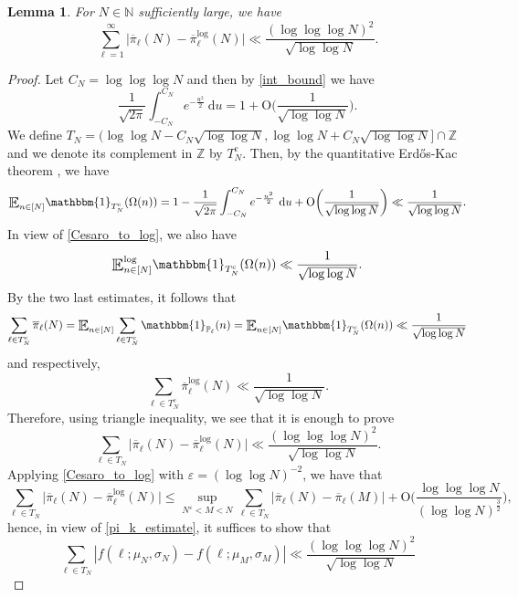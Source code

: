 \documentclass[letter,11pt]{article}
\theoremstyle{plain} %
\newtheorem{lemma}[theorem]{Lemma}
\theoremstyle{definition} %
\theoremstyle{plain}
\theoremstyle{plain}
\theoremstyle{plain}
\numberwithin{equation}{section}
\newcommand{\Erdos}{Erd\H{o}s}
\newcommand{\Oh}{{\mathrm O}}
\newcommand{\N}{\mathbb{N}}
\newcommand{\Z}{\mathbb{Z}}
\renewcommand{\epsilon}{\varepsilon}
\renewcommand{\leq}{\leqslant}
\renewcommand{\P}{\mathbb{P}}
\renewcommand{\d}{~\mathrm{d}}
\newcommand{\E}{\raisebox{-0.4ex}{\scalebox{1.4}[1.3]{$\mathbb{E}$}}}
\newcommand{\Esub}[1]{\raisebox{-0.4ex}{\scalebox{1.4}[1.3]{$\mathbb{E}$}}\raisebox{-0.35ex}{\ensuremath{_{\scriptstyle #1}}}}
\newcommand{\logE}{{\E}^{\log}}
\newcommand{\1}{\mathbbm{1}}
\begin{document}
\begin{lemma}\label{pk_and_logpk}
    For $N\in\N$ sufficiently large, we have  
    $$\sum_{\ell=1}^\infty \big|\overline{\pi}_\ell(N) - \overline{\pi}^{\log}_\ell(N)\big|
    \ll \frac{(\log\log\log{N})^2}{\sqrt{\log\log{N}}}.$$
\end{lemma}


\begin{proof}
    Let $C_N = \log\log\log{N}$ and then by \cref{int_bound}
    we have
    $$\frac{1}{\sqrt{2\pi}}\int_{-C_N}^{C_N} e^{-\frac{u^2}{2}} \d u 
    = 1 + \Oh\bigg(\frac{1}{\sqrt{\log\log{N}}}\bigg).$$
    We define $T_N = (\log\log{N} - C_N\sqrt{\log\log{N}}, \log\log{N} + C_N\sqrt{\log\log{N}}]\cap\Z$ and we denote its complement in $\Z$ by $T_N^\text{c}$. Then, by the quantitative \Erdos-Kac theorem \cite[Theorem 2]{renyi-turan}, we have
    $$\Esub{n\in[N]} \1_{T_N^\text{c}}(\Omega(n))
    = 1 - \frac{1}{\sqrt{2\pi}}\int_{-C_N}^{C_N} e^{-\frac{u^2}{2}} \d u + \Oh\bigg(\frac{1}{\sqrt{\log\log{N}}}\bigg)
    \ll \frac{1}{\sqrt{\log\log{N}}}.$$
    In view of \cref{Cesaro_to_log}, we also have
    $$\logE_{n\in[N]} \1_{T_N^\text{c}}(\Omega(n))
    \ll \frac{1}{\sqrt{\log\log{N}}}.$$
    By the two last estimates, it follows that
    $$\sum_{\ell\in T_N^\text{c}} \overline{\pi}_\ell(N)
    = \Esub{n\in[N]}\sum_{\ell\in T_N^\text{c}} \1_{\P_\ell}(n)
    = \Esub{n\in[N]} \1_{T_N^\text{c}}(\Omega(n))
    \ll \frac{1}{\sqrt{\log\log{N}}}$$
    and respectively,
    $$\sum_{\ell\in T_N^\text{c}} \overline{\pi}^{\log}_\ell(N)
    \ll \frac{1}{\sqrt{\log\log{N}}}.$$
    Therefore, using triangle inequality, we see that it is enough to prove
    \begin{equation*}
        \sum_{\ell\in T_N}\big|\overline{\pi}_\ell(N) - \overline{\pi}^{\log}_\ell(N)\big|
        \ll \frac{(\log\log\log{N})^2}{\sqrt{\log\log{N}}}.
    \end{equation*}
    Applying \cref{Cesaro_to_log} with $\epsilon = (\log\log{N})^{-2}$, we have that
    $$\sum_{\ell\in T_N}\big|\overline{\pi}_\ell(N) - \overline{\pi}^{\log}_\ell(N)\big|
    \leq \sup_{N^\epsilon<M<N}\sum_{\ell\in T_N}\big|\overline{\pi}_\ell(N) - \overline{\pi}_\ell(M)\big| + \Oh\Bigg(\frac{\log\log\log{N}}{(\log\log{N})^\frac{3}{2}}\Bigg),
    $$
    hence, in view of \cref{pi_k_estimate}, it suffices to show that 
    \begin{equation}\label{restriction_TN}
        \sum_{\ell\in T_N}|f(\ell;\mu_N,\sigma_N) - f(\ell;\mu_M,\sigma_M)| \ll \frac{(\log\log\log{N})^2}{\sqrt{\log\log{N}}}
    \end{equation}

\end{proof}
\end{document}
